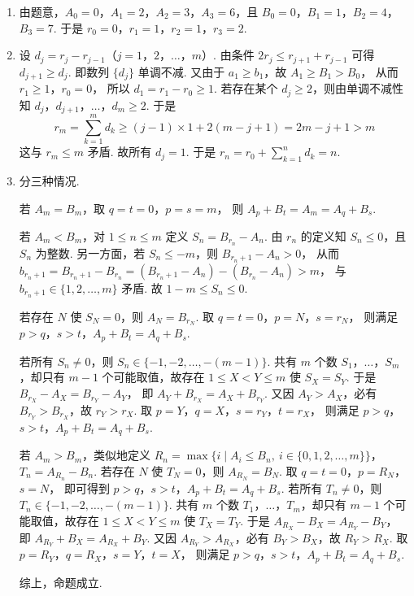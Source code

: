 \begin{solution}
\begin{enumerate}
\item 由题意，\(A_0=0\)，\(A_1=2\)，\(A_2=3\)，\(A_3=6\)，且 \(B_0=0\)，\(B_1=1\)，\(B_2=4\)，\(B_3=7\).
于是 \(r_0=0\)，\(r_1=1\)，\(r_2=1\)，\(r_3=2\).

\item 设
\(d_j=r_j-r_{j-1}\)（\(j=1\)，\(2\)，\(\dots\)，\(m\)）.
由条件
\(2r_j\le r_{j+1}+r_{j-1}\)
可得
\(d_{j+1}\ge d_j\).
即数列 \(\{d_j\}\) 单调不减.
又由于 \(a_1\ge b_1\)，故
\(A_1\ge B_1>B_0\)，
从而
\(r_1\ge 1\)，\(r_0=0\)，
所以
\(d_1=r_1-r_0\ge 1\).
若存在某个 \(d_j\ge 2\)，则由单调不减性知
\(d_j\)，\(d_{j+1}\)，\(\dots\)，\(d_m\ge 2\).
于是
\[
r_m=\sum_{k=1}^m d_k \ge (j-1)\times 1 + 2(m-j+1) =2m-j+1>m
\]
这与 \(r_m\le m\) 矛盾.
故所有 \(d_j=1\). 于是
\(r_n=r_0+\sum_{k=1}^n d_k=n\).

\item 分三种情况.

若 \(A_m=B_m\)，取
\(q=t=0\)，\(p=s=m\)，
则
\(A_p+B_t=A_m=A_q+B_s\).

若 \(A_m<B_m\)，对 \(1\le n\le m\) 定义
\(S_n=B_{r_n}-A_n\).
由 \(r_n\) 的定义知 \(S_n\le 0\)，且 \(S_n\) 为整数.
另一方面，若 \(S_n\le -m\)，则
\(B_{r_n+1}-A_n>0\)，
从而
\(b_{r_n+1}=B_{r_n+1}-B_{r_n} =(B_{r_n+1}-A_n)-(B_{r_n}-A_n)>m\)，
与 \(b_{r_n+1}\in\{1,2,\dots,m\}\) 矛盾.
故
\(1-m\le S_n\le 0\).

若存在 \(N\) 使 \(S_N=0\)，则
\(A_N=B_{r_N}\).
取
\(q=t=0\)，\(p=N\)，\(s=r_N\)，
则满足 \(p>q\)，\(s>t\)，\(A_p+B_t=A_q+B_s\).

若所有 \(S_n\ne 0\)，则
\(S_n\in\{-1,-2,\dots,-(m-1)\}\).
共有 \(m\) 个数 \(S_1\)，\(\dots\)，\(S_m\)，却只有 \(m-1\) 个可能取值，故存在 \(1\le X<Y\le m\) 使
\(S_X=S_Y\).
于是
\(B_{r_X}-A_X=B_{r_Y}-A_Y\)，
即
\(A_Y+B_{r_X}=A_X+B_{r_Y}\).
又因 \(A_Y>A_X\)，必有 \(B_{r_Y}>B_{r_X}\)，故 \(r_Y>r_X\).
取 \(p=Y\)，\(q=X\)，\(s=r_Y\)，\(t=r_X\)，
则满足 \(p>q\)，\(s>t\)，\(A_p+B_t=A_q+B_s\).

若 \(A_m>B_m\)，类似地定义
\(R_n=\max\{i\mid A_i\le B_n,\ i\in\{0,1,2,\dots,m\}\}\)，\(T_n=A_{R_n}-B_n\).
若存在 \(N\) 使 \(T_N=0\)，则 \(A_{R_N}=B_N\). 取
\(q=t=0\)，\(p=R_N\)，\(s=N\)，
即可得到 \(p>q\)，\(s>t\)，\(A_p+B_t=A_q+B_s\).
若所有 \(T_n\ne 0\)，则 \(T_n\in\{-1,-2,\dots,-(m-1)\}\). 共有 \(m\) 个数 \(T_1\)，\(\dots\)，\(T_m\)，却只有 \(m-1\) 个可能取值，故存在 \(1\le X<Y\le m\) 使 \(T_X=T_Y\). 于是
\(A_{R_X}-B_X=A_{R_Y}-B_Y\)，
即
\(A_{R_Y}+B_X=A_{R_X}+B_Y\).
又因 \(A_{R_Y}>A_{R_X}\)，必有 \(B_Y>B_X\)，故 \(R_Y>R_X\).
取 \(p=R_Y\)，\(q=R_X\)，\(s=Y\)，\(t=X\)，
则满足 \(p>q\)，\(s>t\)，\(A_p+B_t=A_q+B_s\).

综上，命题成立.
\end{enumerate}
\end{solution}
